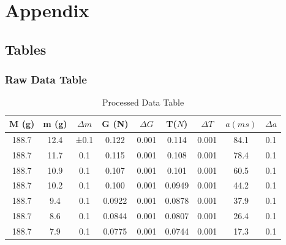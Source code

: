 \documentclass[12pt,a4paper]{article}
\begin{document}
\section{Appendix}
\subsection{Tables}
\subsubsection*{Raw Data Table}
\begin{table}[!ht]
    \centering
    \caption{Processed Data Table}
    \begin{tabular}{|c|c|c|c|c|c|c|c|c|}
    \hline
        M (g) & m (g) & $ \Delta m $ & G (N) & $ \Delta G $& T($ N $) & $ \Delta T $& $ a  (ms) $ & $ \Delta a $\\ \hline
        188.7 & 12.4 & ±0.1 & 0.122& 0.001& 0.114& 0.001 & 84.1 & 0.1  \\ \hline
        188.7 & 11.7 & 0.1 & 0.115& 0.001& 0.108& 0.001 & 78.4 & 0.1  \\ \hline
        188.7 & 10.9 & 0.1 & 0.107& 0.001& 0.101& 0.001 & 60.5 & 0.1  \\ \hline
        188.7 & 10.2 & 0.1 & 0.100& 0.001& 0.0949& 0.001 & 44.2 &0.1  \\ \hline
        188.7 & 9.4 & 0.1 & 0.0922& 0.001& 0.0878& 0.001 & 37.9 & 0.1  \\ \hline
        188.7 & 8.6 & 0.1 & 0.0844& 0.001& 0.0807& 0.001 & 26.4 & 0.1  \\ \hline
        188.7 & 7.9 & 0.1 & 0.0775& 0.001& 0.0744& 0.001 & 17.3 & 0.1 \\ \hline
    \end{tabular}
\end{table}
\end{document}

